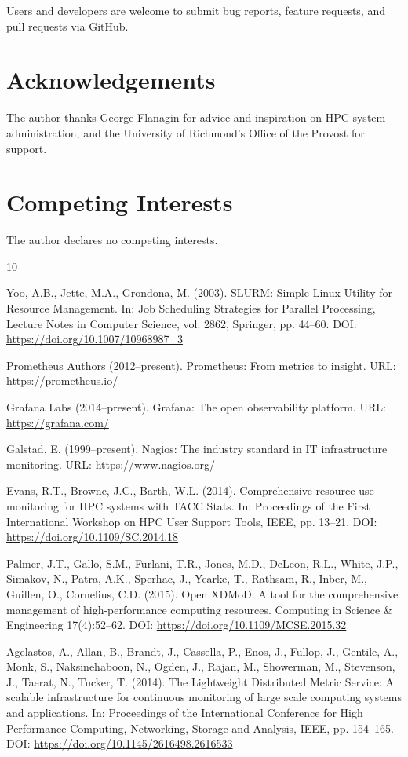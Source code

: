\documentclass[11pt,a4paper]{article}
\begin{document}
Users and developers are welcome to submit bug reports, feature requests, and pull requests via GitHub.

\section*{Acknowledgements}
The author thanks George Flanagin for advice and inspiration on HPC system administration, and the University of Richmond's Office of the Provost for support.

\section*{Competing Interests}
The author declares no competing interests.

\begin{thebibliography}{10}

Yoo, A.B., Jette, M.A., Grondona, M. (2003). SLURM: Simple Linux Utility for Resource Management. In: Job Scheduling Strategies for Parallel Processing, Lecture Notes in Computer Science, vol. 2862, Springer, pp. 44--60. DOI: \url{https://doi.org/10.1007/10968987_3}

Prometheus Authors (2012--present). Prometheus: From metrics to insight.
URL: \url{https://prometheus.io/}

Grafana Labs (2014--present). Grafana: The open observability platform.
URL: \url{https://grafana.com/}

Galstad, E. (1999--present). Nagios: The industry standard in IT
infrastructure monitoring. URL: \url{https://www.nagios.org/}

Evans, R.T., Browne, J.C., Barth, W.L. (2014). Comprehensive resource use monitoring for HPC systems with TACC Stats. In: Proceedings of the First International Workshop on HPC User Support Tools, IEEE, pp. 13--21. DOI: \url{https://doi.org/10.1109/SC.2014.18}

Palmer, J.T., Gallo, S.M., Furlani, T.R., Jones, M.D., DeLeon, R.L., White, J.P., Simakov, N., Patra, A.K., Sperhac, J., Yearke, T., Rathsam, R., Inber, M., Guillen, O., Cornelius, C.D. (2015). Open XDMoD: A tool for the comprehensive management of high-performance computing resources. Computing in Science \& Engineering 17(4):52--62. DOI: \url{https://doi.org/10.1109/MCSE.2015.32}

Agelastos, A., Allan, B., Brandt, J., Cassella, P., Enos, J., Fullop, J., Gentile, A., Monk, S., Naksinehaboon, N., Ogden, J., Rajan, M., Showerman, M., Stevenson, J., Taerat, N., Tucker, T. (2014). The Lightweight Distributed Metric Service: A scalable infrastructure for continuous monitoring of large scale computing systems and applications. In: Proceedings of the International Conference for High Performance Computing, Networking, Storage and Analysis, IEEE, pp. 154--165. DOI: \url{https://doi.org/10.1145/2616498.2616533}


\end{thebibliography}
\end{document}
